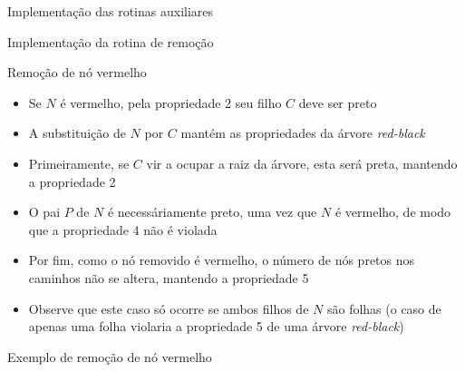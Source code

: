 \begin{frame}[fragile]{Implementação das rotinas auxiliares}
\end{frame}

\begin{frame}[fragile]{Implementação da rotina de remoção}
\end{frame}

\begin{frame}[fragile]{Remoção de nó vermelho}

    \begin{itemize}
        \item Se $N$ é vermelho, pela propriedade 2 seu filho $C$ deve ser preto

        \item A substituição de $N$ por $C$ mantém as propriedades da
            árvore \textit{red-black}

        \item Primeiramente, se $C$ vir a ocupar a raiz da árvore, esta será preta, mantendo
            a propriedade 2

        \item O pai $P$ de $N$ é necessáriamente preto, uma vez que $N$ é vermelho, de modo que
            a propriedade 4 não é violada

        \item Por fim, como o nó removido é vermelho, o número de nós pretos nos caminhos não
            se altera, mantendo a propriedade 5

        \item Observe que este caso só ocorre se ambos filhos de $N$ são folhas (o caso de apenas
            uma folha violaria a propriedade 5 de uma árvore \textit{red-black})

    \end{itemize}

\end{frame}

\begin{frame}[fragile]{Exemplo de remoção de nó vermelho}


\end{frame}

